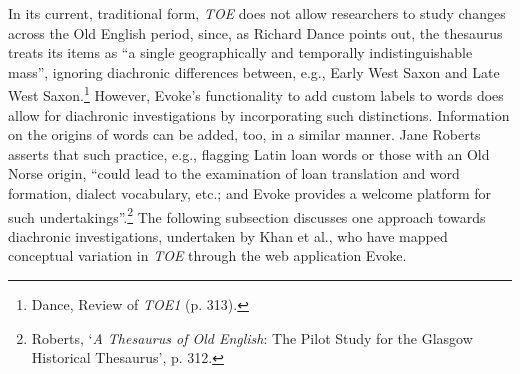 In its current, traditional form, \textit{TOE} does not allow researchers to study changes across the Old English period, since, as Richard Dance points out, the thesaurus treats its items as ``a single geographically and temporally indistinguishable mass'', ignoring diachronic differences between, e.g., Early West Saxon and Late West Saxon.\footnote{Dance, Review of \textit{TOE1} (p. 313).} However, Evoke's functionality to add custom labels to words does allow for diachronic investigations by incorporating such distinctions. %
Information on the origins of words can be added, too, in a similar manner. Jane Roberts 
asserts that such practice, e.g., flagging Latin loan words or those with an Old Norse origin, ``could lead to the examination of loan translation and word formation, dialect vocabulary, etc.; and Evoke provides a welcome platform for such undertakings''.\footnote{Roberts, `\textit{A Thesaurus of Old English}: The Pilot Study for the Glasgow Historical Thesaurus', p. 312.} The following subsection discusses one approach towards diachronic investigations, undertaken by Khan et al., who have mapped conceptual variation in \textit{TOE} through the web application Evoke.

